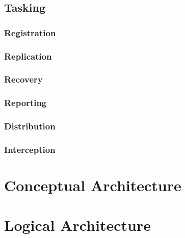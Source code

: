 \documentclass[a4paper]{book}
\begin{document}
\subsection{Tasking}
\label{feature:petasos.tasking}
\subsubsection{Registration}
\label{feature:petasos.tasking.registration}
\subsubsection{Replication}
\label{feature:petasos.tasking.replication}
\subsubsection{Recovery}
\label{feature:petasos.tasking.recovery}
\subsubsection{Reporting}
\label{feature:petasos.tasking.reporting}
\subsubsection{Distribution}
\label{feature:petasos.tasking.distribution}
\subsubsection{Interception}
\label{feature:petasos.tasking.interception}

\section{Conceptual Architecture}
\section{Logical Architecture}
\end{document}
